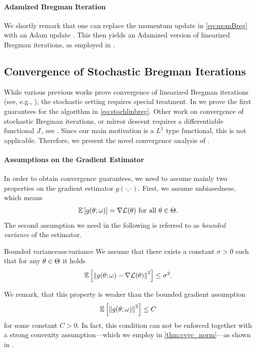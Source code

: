 \paragraph{Adamized Bregman Iteration} We shortly remark that one can replace the momentum update in \cref{eq:momBreg} with an Adam update \cite{kingma2014adam}. This then yields an Adamized version of linearized Bregman iterations, as employed in \cite{bungert2022bregman}.


\subsection{Convergence of Stochastic Bregman Iterations}\label{sec:ConvAna}
%
%
While various previous works prove convergence of linearized Bregman iterations (see, e.g., \cite{osher2005iterative, cai2009convergence}), the stochastic setting requires special treatment. In \cite{bungert2022bregman} we prove the first guarantees for the algorithm in \cref{eq:stochlinbreg}. Other work on convergence of stochastic Bregman iterations, or mirror descent requires a differentiable functional $J$, see \cite{dragomir2021fast, hanzely2021fastest, zhang2018convergence, d2021stochastic, aubin2022mirror}. Since our main motivation is a $L^1$ type functional, this is not applicable. Therefore, we present the novel convergence analysis of \cite{bungert2022bregman}.
%
%
\paragraph{Assumptions on the Gradient Estimator}
%
In order to obtain convergence guarantees, we need to assume mainly two properties on the gradient estimator $g(\cdot,\cdot)$. First, we assume unbiasedness, which means
%
\begin{align*}
\mathbb{E}\left[g(\theta;\omega)\right] = \nabla\mathcal{L}(\theta)\text{ for all }\theta\in\Theta.
\end{align*}
%
The second assumption we need in the following is referred to as \emph{bounded variance} of the estimator.
%
\begin{assumption}{Bounded variance}{ass:variance}
We assume that there exists a constant $\sigma>0$ such that for any $\theta\in\Theta$ it holds
\begin{align}
    \mathbb{E}\left[\left\|g(\theta;\omega)-\nabla\mathcal{L}(\theta)\right\|^2\right] \leq \sigma^2.
\end{align}
\end{assumption}
%
%
\begin{remark}{}{}
We remark, that this property is weaker than the bounded gradient assumption
%
\begin{align*}
\mathbb{E}\left[\left\|g(\theta;\omega)\right\|^2\right] \leq C
\end{align*}
%
for some constant $C>0$. In fact, this condition can not be enforced together with a strong convexity assumption---which we employ in \cref{thm:cvgc_norm}---as shown in \cite{pmlr-v80-nguyen18c}.
\end{remark}

